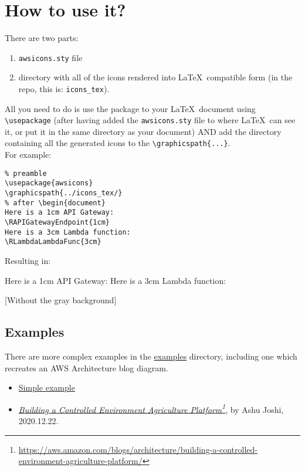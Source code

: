 \documentclass[12pt]{article}
\begin{document}
\section{How to use it?}
There are two parts:
\begin{enumerate}
\item \texttt{awsicons.sty} file
\item directory with all of the icons rendered into \LaTeX\ compatible form (in the repo, this is: \texttt{icons\_tex}).
\end{enumerate}
All you need to do is use the package to your \LaTeX\ document using \texttt{{\textbackslash}usepackage} (after having added the \texttt{awsicons.sty} file to where \LaTeX\ can see it, or put it in the same directory as your document) AND add the directory containing all the generated icons to the \texttt{{\textbackslash}graphicspath\{...\}}.\\

\noindent For example:
\vspace{4mm}

\begin{blockquote}
\begin{verbatim}
% preamble
\usepackage{awsicons} 
\graphicspath{../icons_tex/}
% after \begin{document}
Here is a 1cm API Gateway:
\RAPIGatewayEndpoint{1cm}
Here is a 3cm Lambda function:
\RLambdaLambdaFunc{3cm}

\end{verbatim}
\end{blockquote}

\noindent Resulting in:\\
\begin{blockquote}
Here is a 1cm API Gateway:
\RAPIGatewayEndpoint{1cm}
Here is a 3cm Lambda function:
\RLambdaLambdaFunc{3cm}

\end{blockquote}

[Without the gray background]
    
\subsection{Examples}
There are more complex examples in the \href{https://github.com/gnewton/awsArchIcons2LaTeX/tree/main/examples}{examples} directory, including one which recreates an AWS Architecture blog diagram.

\begin{itemize}
\item \href{https://github.com/gnewton/awsArchIcons2LaTeX/blob/main/examples/simple.pdf}{Simple example}
\item \textit{\href{https://github.com/gnewton/awsArchIcons2LaTeX/blob/main/examples/Data-pipeline-Grov-Technologies.pdf}{Building a Controlled Environment Agriculture Platform}\footnote{\url{https://aws.amazon.com/blogs/architecture/building-a-controlled-environment-agriculture-platform/}}}, by Ashu Joshi, 2020.12.22.
\end{itemize}
  
\end{document}
